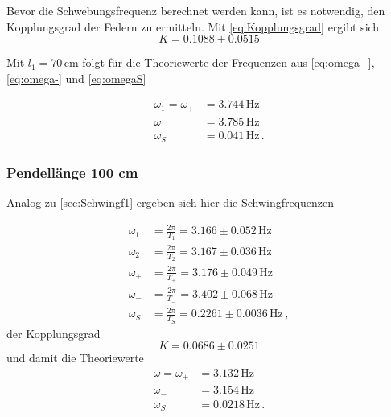 Bevor die Schwebungsfrequenz berechnet werden kann, ist es notwendig, den Kopplungsgrad der Federn zu ermitteln.
Mit \eqref{eq:Kopplungsgrad} ergibt sich
\begin{equation*}
  K = 0.1088 \pm 0.0515
\end{equation*}

Mit $l_1=70 \, \unit{\centi\meter}$ folgt für die Theoriewerte der Frequenzen aus \eqref{eq:omega+}, \eqref{eq:omega-} und \eqref{eq:omegaS}

\begin{align*}
\omega_1 = \omega_+ & = 3.744 \, \unit{\hertz} \\ 
\omega_{-} & = 3.785            \, \unit{\hertz} \\ 
\omega_{S} & = 0.041           \, \unit{\hertz} \,.
\end{align*}

\subsubsection{Pendellänge 100 cm}

Analog zu \autoref{sec:Schwingf1} ergeben sich hier die Schwingfrequenzen


\begin{align*}
  \omega_1 & =  \frac{2π}{T_1}         = 3.166   \pm 0.052 \,\unit{\hertz}  \\
  \omega_2 & =  \frac{2π}{T_2}         = 3.167   \pm 0.036 \,\unit{\hertz}  \\
  \omega_+ & =  \frac{2π}{T_+}         = 3.176   \pm 0.049 \,\unit{\hertz}  \\
  \omega_- & =  \frac{2π}{T_-}         = 3.402   \pm 0.068 \,\unit{\hertz}  \\
  \omega_S & =  \frac{2π}{T_S}        = 0.2261  \pm 0.0036 \,\unit{\hertz} \,,
\end{align*}
der Kopplungsgrad
\begin{equation*}
  K = 0.0686 \pm 0.0251
\end{equation*}
und damit die Theoriewerte
\begin{align*}
\omega    = \omega_+ & = 3.132 \, \unit{\hertz} \nonumber \\
\omega_- & = 3.154          \, \unit{\hertz} \nonumber \\
\omega_S & = 0.0218         \, \unit{\hertz} \nonumber \,.
\end{align*}